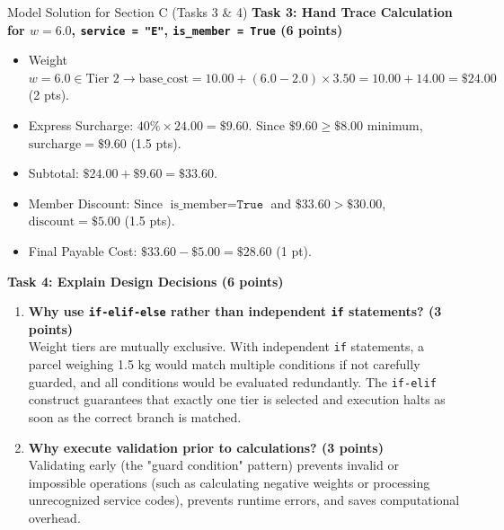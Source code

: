 \documentclass[11pt,a4paper]{article}
\begin{document}
\begin{solbox}{Model Solution for Section C (Tasks 3 \& 4)}
\textbf{Task 3: Hand Trace Calculation for $w = 6.0$, \texttt{service = "E"}, \texttt{is\_member = True} (6 points)}
\begin{itemize}[leftmargin=2em]
  \item Weight $w = 6.0 \in \text{Tier 2} \rightarrow \text{base\_cost} = 10.00 + (6.0 - 2.0) \times 3.50 = 10.00 + 14.00 = \mathbf{\$24.00}$ (2 pts).
  \item Express Surcharge: $40\% \times 24.00 = \$9.60$. Since $\$9.60 \ge \$8.00$ minimum, $\text{surcharge} = \mathbf{\$9.60}$ (1.5 pts).
  \item Subtotal: $\$24.00 + \$9.60 = \$33.60$.
  \item Member Discount: Since $\text{is\_member} = \texttt{True}$ and $\$33.60 > \$30.00$, $\text{discount} = \mathbf{\$5.00}$ (1.5 pts).
  \item Final Payable Cost: $\$33.60 - \$5.00 = \mathbf{\$28.60}$ (1 pt).
\end{itemize}

\vspace{0.15cm}
\textbf{Task 4: Explain Design Decisions (6 points)}
\begin{enumerate}[label=\alph*),leftmargin=2em]
  \item \textbf{Why use \texttt{if-elif-else} rather than independent \texttt{if} statements? (3 points)} \\
  Weight tiers are mutually exclusive. With independent \texttt{if} statements, a parcel weighing 1.5 kg would match multiple conditions if not carefully guarded, and all conditions would be evaluated redundantly. The \texttt{if-elif} construct guarantees that exactly one tier is selected and execution halts as soon as the correct branch is matched.
  \item \textbf{Why execute validation prior to calculations? (3 points)} \\
  Validating early (the "guard condition" pattern) prevents invalid or impossible operations (such as calculating negative weights or processing unrecognized service codes), prevents runtime errors, and saves computational overhead.
\end{enumerate}
\end{solbox}

\newpage

\end{document}

